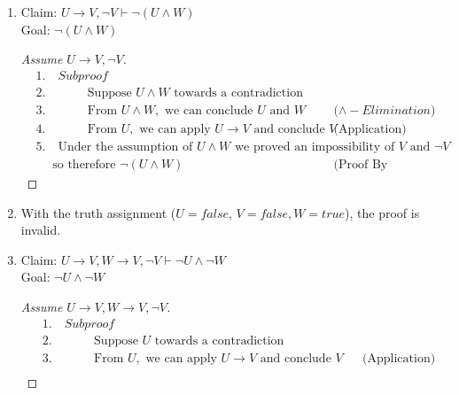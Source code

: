 \documentclass{article}
\begin{document}
\begin{enumerate}
\begin{enumerate}
\begin{proof}[Assume $(W \land X) \rightarrow \neg Y$]
\begin{align*}
                &7. \quad \text{Under the assumption of } X, \text{ we proved } \neg (W \land Y), \text{ so therefore } X \rightarrow \neg (W \land Y) && \text{(Direct Proof)}
            \end{align*}
        \end{proof}
        \item
        Claim: $U \rightarrow V, \neg V \vdash \neg (U \land W)$ \\
        Goal: $\neg (U \land W)$
        \begin{proof}[Assume $U \rightarrow V, \neg V$]
            \begin{align*}
                &1. \quad Subproof \\
                &2. \quad \hspace{1cm} \text{Suppose } U \land W \text{ towards a contradiction} \\
                &3. \quad \hspace{1cm} \text{From } U \land W, \text{ we can conclude } U \text{ and } W && \text{($\land - Elimination$)} \\
                &4. \quad \hspace{1cm} \text{From } U, \text{ we can apply } U \rightarrow V \text{ and conclude } V && \text{(Application)} \\
                &5. \quad \text{Under the assumption of } U \land W \text{ we proved an impossibility of } V \text{ and } \neg V \\
                &\quad \text{ so therefore } \neg (U \land W) && \text{(Proof By Contradiction)}
            \end{align*}
        \end{proof}
        \item With the truth assignment ($U = false$, $V = false, W = true$), the proof is invalid.
        \item
        Claim: $U \rightarrow V, W \rightarrow V, \neg V \vdash \neg U \land \neg W$ \\
        Goal: $\neg U \land \neg W$
        \begin{proof}[Assume $U \rightarrow V, W \rightarrow V, \neg V$]
            \begin{align*}
                &1. \quad Subproof \\
                &2. \quad \hspace{1cm} \text{Suppose } U \text{ towards a contradiction} \\
                &3. \quad \hspace{1cm} \text{From } U, \text{ we can apply } U \rightarrow V \text{ and conclude } V && \text{(Application)} \\

\end{align*}
\end{proof}
\end{enumerate}
\end{enumerate}
\end{document}
